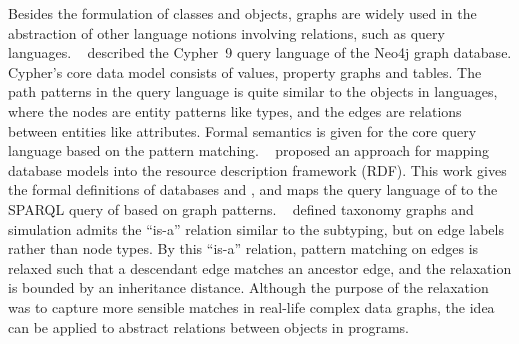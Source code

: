 Besides the formulation of classes and objects, graphs are widely used in the abstraction of other language notions involving relations, such as query languages.
~\cite{francis2018cypher} described the Cypher~9 query language of the Neo4j graph database.
Cypher's core data model consists of values, property graphs and tables.
The path patterns in the query language is quite similar to the objects in {\OO} languages,
where the nodes are entity patterns like types, and the edges are relations between entities like attributes.
Formal semantics is given for the core query language based on the pattern matching.
~\cite{tong2018mapping} proposed an approach for mapping {\OO} database models into the resource description framework (\gls{RDF}).
This work gives the formal definitions of {\OO} databases and {\RDF}, and maps the query language of {\OODB} to the \gls{SPARQL} query of {\RDF} based on graph patterns.
~\cite{li2017relaxing} defined taxonomy graphs and simulation admits the ``is-a'' relation similar to the {\OO} subtyping, but on edge labels rather than node types.
By this ``is-a'' relation, pattern matching on edges is relaxed such that a descendant edge matches an ancestor edge, and the relaxation is bounded by an inheritance distance.
Although the purpose of the relaxation was to capture more sensible matches in real-life complex data graphs,
the idea can be applied to abstract relations between objects in {\OO} programs.

\endinput